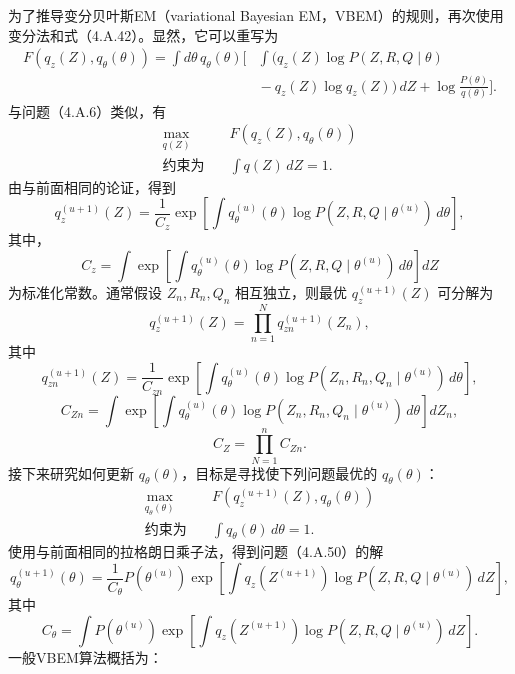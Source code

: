 为了推导变分贝叶斯EM（variational Bayesian EM，VBEM）的规则，再次使用变分法和式（4.A.42）。显然，它可以重写为
\begin{equation}
\begin{aligned}
F(q_z(Z),q_\theta(\theta))
=\int d\theta\,q_\theta(\theta)\biggl[&
\int\bigl(q_z(Z)\log P(Z,R,Q\mid\theta)\\
&{}-q_z(Z)\log q_z(Z)\bigr)\,dZ
+\log\frac{P(\theta)}{q(\theta)}\biggr].
\end{aligned}\tag{4.A.43}
\end{equation}
与问题（4.A.6）类似，有
\begin{equation}
\begin{aligned}
\max_{q(Z)}\quad&F(q_z(Z),q_\theta(\theta))\\
\text{约束为}\quad&\int q(Z)\,dZ=1.
\end{aligned}\tag{4.A.44}
\end{equation}
由与前面相同的论证，得到
\begin{equation}
q_z^{(u+1)}(Z)=\frac1{C_z}
\exp\left[\int q_\theta^{(u)}(\theta)\log P(Z,R,Q\mid\theta^{(u)})\,d\theta\right],\tag{4.A.45}
\end{equation}
其中，
\[
C_z=\int\exp\left[\int q_\theta^{(u)}(\theta)
\log P(Z,R,Q\mid\theta^{(u)})\,d\theta\right]dZ
\]
为标准化常数。通常假设 $Z_n,R_n,Q_n$ 相互独立，则最优 $q_z^{(u+1)}(Z)$ 可分解为
\begin{equation}
q_z^{(u+1)}(Z)=\prod_{n=1}^{N}q_{zn}^{(u+1)}(Z_n),\tag{4.A.46}
\end{equation}
其中
\begin{equation}
q_{zn}^{(u+1)}(Z)=\frac1{C_{zn}}
\exp\left[\int q_\theta^{(u)}(\theta)
\log P(Z_n,R_n,Q_n\mid\theta^{(u)})\,d\theta\right],\tag{4.A.47}
\end{equation}
\begin{equation}
C_{Zn}=\int\exp\left[\int q_\theta^{(u)}(\theta)
\log P(Z_n,R_n,Q_n\mid\theta^{(u)})\,d\theta\right]dZ_n,\tag{4.A.48}
\end{equation}
\begin{equation}
C_Z=\prod_{N=1}^{n}C_{Zn}.\tag{4.A.49}
\end{equation}
接下来研究如何更新 $q_\theta(\theta)$，目标是寻找使下列问题最优的 $q_\theta(\theta)$：
\begin{equation}
\begin{aligned}
\max_{q_\theta(\theta)}\quad&F(q_z^{(u+1)}(Z),q_\theta(\theta))\\
\text{约束为}\quad&\int q_\theta(\theta)\,d\theta=1.
\end{aligned}\tag{4.A.50}
\end{equation}
使用与前面相同的拉格朗日乘子法，得到问题（4.A.50）的解
\begin{equation}
q_\theta^{(u+1)}(\theta)=\frac1{C_\theta}P(\theta^{(u)})
\exp\left[\int q_z(Z^{(u+1)})\log P(Z,R,Q\mid\theta^{(u)})\,dZ\right],\tag{4.A.51}
\end{equation}
其中
\[
C_\theta=\int P(\theta^{(u)})
\exp\left[\int q_z(Z^{(u+1)})\log P(Z,R,Q\mid\theta^{(u)})\,dZ\right].
\]
一般VBEM算法概括为：

